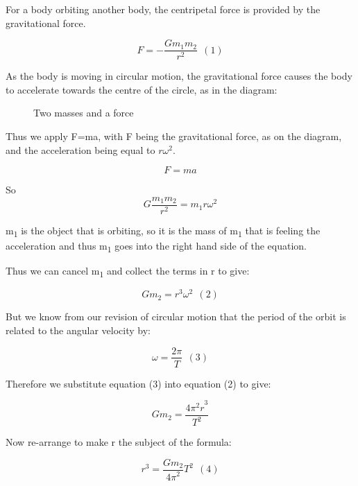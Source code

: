 \documentclass[a4paper,11pt,twoside]{memoir}
\begin{document}
For a body orbiting another body, the centripetal force is provided by
the gravitational force.

\[F = - \frac{Gm_{1}m_{2}}{r^{2}}\ \ (1)\]

As the body is moving in circular motion, the gravitational force causes
the body to accelerate towards the centre of the circle, as in the
diagram:

\begin{figure}[h]
  \begin{center}
  \end{center}
  \label{masses-2}
  \caption{Two masses and a force}
\end{figure}

Thus we apply F=ma, with F being the gravitational force, as on the
diagram, and the acceleration being equal to $r\omega^2$.

\[F = ma\]

So \[G\frac{m_{1}m_{2}}{r^{2}} = m_{1}r\omega^{2}\]

m\textsubscript{1} is the object that is orbiting, so it is the mass of
m\textsubscript{1} that is feeling the acceleration and thus
m\textsubscript{1} goes into the right hand side of the equation.

Thus we can cancel m\textsubscript{1} and collect the terms in r to
give:

\[Gm_{2} = r^{3}\omega^{2}\ \ (2)\]

But we know from our revision of circular motion that the period of the
orbit is related to the angular velocity by:

\[\omega = \frac{2\pi}{T}\ \ (3)\]

Therefore we substitute equation (3) into equation (2) to give:

\[Gm_{2} = \frac{{4\pi^{2}r}^{3}}{T^{2}}\]

Now re-arrange to make r the subject of the formula:

\[r^{3} = \frac{Gm_{2}}{{4\pi}^{2}}T^{2}\ \ (4)\]
\end{document}
